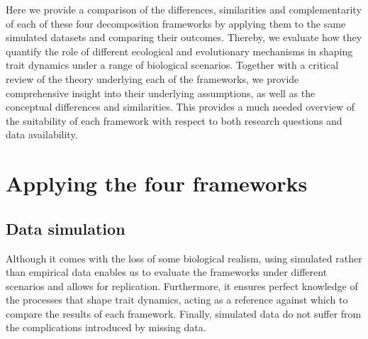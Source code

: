 Here we provide a comparison of the differences, similarities and complementarity of each of these four decomposition frameworks by applying them to the same simulated datasets and comparing their outcomes. Thereby, we evaluate how they quantify the role of different ecological and evolutionary mechanisms in shaping trait dynamics under a range of biological scenarios. Together with a critical review of the theory underlying each of the frameworks, we provide comprehensive insight into their underlying assumptions, as well as the conceptual differences and similarities. This provides a much needed overview of the suitability of each framework with respect to both research questions and data availability.



\section{Applying the four frameworks}


\subsection{Data simulation}

Although it comes with the loss of some biological realism, using simulated rather than empirical data enables us to evaluate the frameworks under different scenarios and allows for replication. Furthermore, it ensures perfect knowledge of the processes that shape trait dynamics, acting as a reference against which to compare the results of each framework. Finally, simulated data do not suffer from the complications introduced by missing data. 

